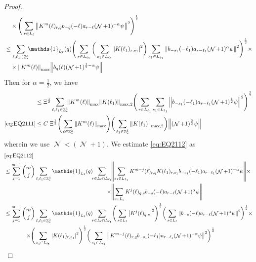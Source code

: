 \documentclass[sn-mathphys, Numbered ,a4paper]{sn-jnl}%
\DeclareMathOperator{\Z}{\mathbb{Z}}
\DeclareMathOperator{\NN}{\mathcal{N}}
\newcommand{\half}{\frac{1}{2}}
\theoremstyle{plain}
\theoremstyle{definition}
\theoremstyle{remark}
\theoremstyle{plain}
\theoremstyle{definition}
\theoremstyle{remark}
\begin{document}
\begin{proof}
\begin{align}
 	&\quad \times \Bigg( \sum\limits_{r \in L_\ell}  \norm{  K^{m}(\ell)_{r,q}  b_{-q}(-\ell) a_{r-\ell} (\NN+1)^{-\alpha}\psi }^2\Bigg)^\half \nonumber\\
 	&\leq \sum\limits_{\ell,\ell_1 \in \Z^3_*} \!\!\mathds{1}_{L_\ell}(q) \Bigg( \sum\limits_{r \in L_{\ell_1}} \bigg( \sum\limits_{s_1 \in L_{\ell_1}}\abs{K(\ell_1)_{r,s_1}}^2\bigg) \sum\limits_{s_1 \in L_{\ell_1}} \norm{ b_{-s_1}(-\ell_1)  a_{r-\ell_1} (\NN+1)^{\alpha}\psi}^2\Bigg)^\half \times\nonumber\\
 	&\quad \times  \norm{  K^{m}(\ell)}_{\mathrm{max}} \norm{b_{q}(\ell) (\NN+1)^{\half-\alpha}\psi } \nonumber\\
\end{align}
	Then for $\alpha = \half$, we have 
\begin{align}
 	&\leq \Xi^\half \sum\limits_{\ell,\ell_1 \in \Z^3_*} \!\! \norm{ K^{m}(\ell)}_{\mathrm{max}} \norm{K(\ell_1)}_{\mathrm{max,2}}  \Bigg( \sum\limits_{r \in L_{\ell_1}} \sum\limits_{s_1 \in L_{\ell_1}} \norm{ b_{-s_1}(-\ell_1)  a_{r-\ell_1} (\NN+1)^{\half}\psi}^2\Bigg)^\half \nonumber\\
 	\eqref{eq:EQ2111}&\leq C\; \Xi^\half \Bigg(\sum\limits_{\ell \in \Z^3_*}  \norm{  K^{m}(\ell)}_{\mathrm{max}}\Bigg) \bigg(\sum\limits_{\ell_1 \in \Z^3_*} \norm{K(\ell_1)}_{\mathrm{max,2}} \bigg) \norm{ (\NN+1)^{\frac{3}{2}}\psi}  \label{eq:estEQ2111} 
 \end{align}
 wherein we use $\NN<(\NN+1)$. We estimate \eqref{eq:EQ2112} as 
  \begin{alignat}{2}
  	&\eqref{eq:EQ2112}\nonumber\\
  	&\leq \sum\limits_{j=1}^{m-1} {{m}\choose j} \sum\limits_{\ell, \ell_1\in \Z^3_*} \mathds{1}_{L_{\ell}}(q)\!\! \begin{aligned}[t]
  	\sum\limits_{r\in L_{\ell} \cap L_{\ell_1}}\! &\norm{  \sum\limits_{s_1 \in L_{\ell_1}} K^{m-j}(\ell)_{r,q} K(\ell_1)_{r,s_1} b_{-s_1}(-\ell_1) a_{r-\ell_1} (\NN+1)^{-\alpha}\psi}\times\nonumber \\\times &\norm{\sum\limits_{s \in L_\ell} K^{j}(\ell)_{q,s}  b_{-s}(-\ell)  a_{r-\ell} (\NN+1)^{\alpha}\psi }
  	\end{aligned} \nonumber\\
    &\leq \sum\limits_{j=1}^{m-1} \begin{aligned}[t] {{m}\choose j} &\sum\limits_{\ell, \ell_1\in \Z^3_*} \mathds{1}_{L_{\ell}}(q)\!\! 
    \sum\limits_{r\in L_{\ell} \cap L_{\ell_1}}\! \Bigg( \sum\limits_{s \in L_\ell} \abs{K^{j}(\ell)_{q,s}}^2\Bigg)^\half \bigg( \sum\limits_{s \in L_\ell}\norm{  b_{-s}(-\ell) a_{r-\ell} (\NN+1)^{\alpha}\psi}^2\bigg)^\half \times\nonumber\\ \times \Bigg( &\sum\limits_{s_1 \in L_{\ell_1}}\abs{K(\ell_1)_{r,s_1}}^2\Bigg)^\half \bigg(\sum\limits_{s_1 \in L_{\ell_1}}\norm{ K^{m-j}(\ell)_{r,q}  b_{-s_1}(-\ell_1)  a_{r-\ell_1} (\NN+1)^{-\alpha}\psi }^2\bigg)^\half

\end{aligned}
\end{alignat}
\end{proof}
\end{document}
